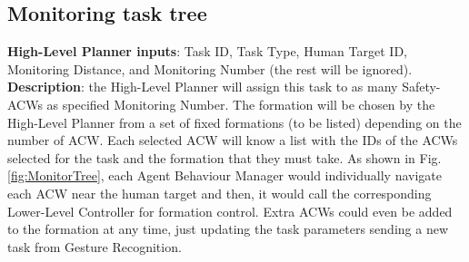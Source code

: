 \subsection{Monitoring task tree}
\label{sec:MonitoringTaskTree}
\textbf{High-Level Planner inputs}: Task ID, Task Type, Human Target ID, Monitoring Distance, and Monitoring Number (the rest will be ignored).
\textbf{Description}: the High-Level Planner will assign this task to as many Safety-ACWs as specified Monitoring Number. The formation will be chosen by the High-Level Planner from a set of fixed formations (to be listed) depending on the number of \gls{ACW}. Each selected \gls{ACW} will know a list with the IDs of the \glspl{ACW} selected for the task and the formation that they must take. As shown in Fig. \ref{fig:MonitorTree}, each Agent Behaviour Manager would individually navigate each \gls{ACW} near the human target and then, it would call the corresponding Lower-Level Controller for formation control. Extra \glspl{ACW} could even be added to the formation at any time, just updating the task parameters sending a new task from Gesture Recognition.

